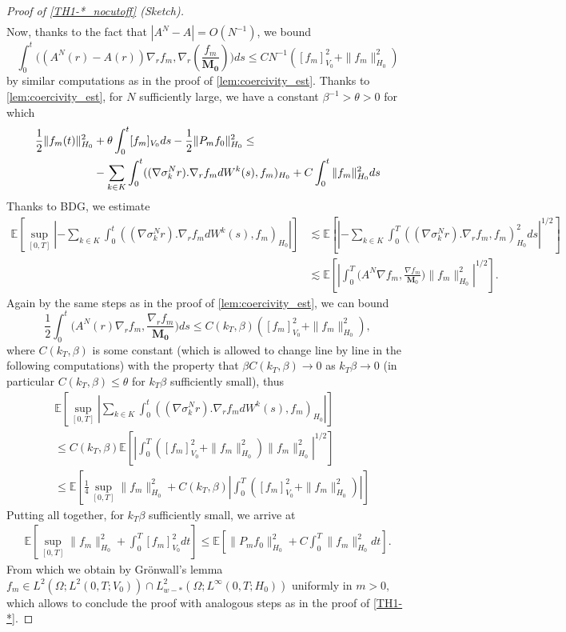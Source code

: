 \documentclass[a4paper,12pt, reqno]{amsart}
\newcommand{\M}{\mathbf{M}}
\begin{document}
\begin{proof}[Proof of \autoref{TH1-*_nocutoff} (Sketch)]
\begin{align*}
\end{align*}
Now, thanks to the fact that $|A^N- A| =O(N^{-1})$, we bound $$\int_0^t\big(\left(A^N(r)- A(r)\right) \nabla_rf_m,\nabla_r(\dfrac{f_m}{\mathbf{M_0}})\big)ds \le CN^{-1} ([f_m]_{V_0}^2 + \|f_m\|_{H_0}^2)$$ by similar computations as in the proof of \autoref{lem:coercivity_est}. Thanks to  \autoref{lem:coercivity_est}, for $N$ sufficiently large, we have a constant $\beta^{-1}>\theta>0$ for which 
\begin{align}
   \dfrac{1}{2} \Vert f_m(t)\Vert_{H_0}^2&+\theta\int_0^t[f_m]_{V_0}ds-\dfrac{1}{2}\Vert P_mf_{0}\Vert_{H_0}^2\le\notag\\
            & -\sum_{k\in K}\int_0^t((\nabla \sigma_k^Nr).\nabla_rf_m dW^k(s),f_m)_{H_0} + C\int_0^t\|f_m\|_{H_0}^2 ds \notag
\end{align}
Thanks to BDG, we estimate 
\begin{align*}\mathbb{E}\left[\sup_{[0, T]} \left| -\sum_{k\in K}\int_0^t((\nabla \sigma_k^Nr).\nabla_rf_m dW^k(s),f_m)_{H_0} \right|\right] &\lesssim \mathbb{E}\left[ \left| -\sum_{k\in K}\int_0^T((\nabla \sigma_k^Nr).\nabla_rf_m ,f_m)_{H_0}^2ds \right|^{1/2}\right]\\
& \lesssim \mathbb{E}\left[\left | \int_0^T(A^N \nabla f_m, { \frac{ \nabla f_m}{\M_0}) \|f_m\|^2_{H_0}}\right|^{1/2}\right].
\end{align*}
Again by the same steps as in the proof of \autoref{lem:coercivity_est}, we can bound $$\dfrac{1}{2}\int_0^t\big(A^N(r) \nabla_rf_m,\dfrac{\nabla_rf_m}{\mathbf{M_0}}\big)ds \le C(k_T, \beta)([f_m]_{V_0}^2 + \|f_m\|_{H_0}^2),$$ where $C(k_T, \beta)$ is some constant (which is allowed to change line by line in the following computations) with the property that $\beta C(k_T, \beta) \rightarrow 0$ as $k_T\beta \rightarrow 0$ (in particular $C(k_T, \beta) \le \theta$ for $k_T \beta$ sufficiently small), thus 
\begin{align*}&\mathbb{E}\left[\sup_{[0, T]} \left| \sum_{k\in K}\int_0^t((\nabla \sigma_k^Nr).\nabla_rf_m dW^k(s),f_m)_{H_0} \right|\right]\\ &\le C(k_T, \beta)\mathbb{E}\left[\left | \int_0^T([f_m]_{V_0}^2 + \|f_m\|_{H_0}^2) \|f_m\|^2_{H_0}\right|^{1/2}\right] \\
&\le \mathbb{E}\left[ \frac{1}{4}\sup_{[0, T]}\|f_m\|^2_{H_0} + C(k_T, \beta)\left | \int_0^T([f_m]_{V_0}^2 + \|f_m\|_{H_0}^2) \right|\right]
\end{align*}
Putting all together, for $k_T\beta$ sufficiently small, we arrive at 
\begin{align*}
    \mathbb{E}\left[\sup_{[0, T]}\|f_m\|^2_{H_0} +  \int_0^T[f_m]_{V_0}^2  dt\right] \le  \mathbb{E}\left[ \|P_mf_0\|^2_{H_0} + C \int_0^T\|f_m\|_{H_0}^2 dt\right].
\end{align*}
From which we obtain by Gr\"onwall's  lemma $f_m \in L^2(\Omega; L^2(0, T; V_0))\cap L^2_{w-*}(\Omega; L^\infty (0, T; H_0))$ uniformly in $m>0,$ which allows to conclude the proof with analogous steps as in the proof of \autoref{TH1-*}. 
         \end{proof}
\end{document}
